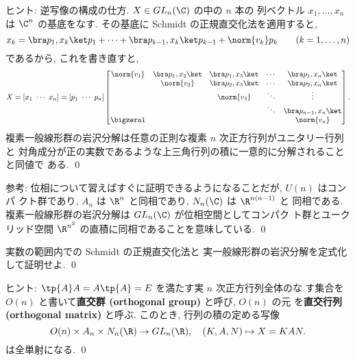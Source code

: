 \documentclass[12pt,twoside]{jarticle}
\begin{document}
\noindent
ヒント:  逆写像の構成の仕方. $X\in GL_n(\C)$ の中の $n$ 本の
列ベクトル $x_1,\dots,x_n$ は $\C^n$ の基底をなす. 
その基底に Schmidt の正規直交化法を適用すると,
\begin{equation*}
  x_k = \bra p_1,x_k\ket p_1 + \cdots + \bra p_{k-1},x_k\ket p_{k-1} +\norm{v_k} p_k 
  \qquad (k=1,\dots,n)
\end{equation*}
であるから, これを書き直すと,
\begin{equation*}
  X = [x_1\ \cdots\ x_n] =
  [p_1\ \cdots\ p_n]
  \begin{bmatrix}
    \norm{v_1} & \bra p_1,x_2\ket & \bra p_1,x_3\ket & \cdots & \bra p_1,x_n\ket \\
               & \norm{v_2}       & \bra p_2,x_3\ket & \cdots & \bra p_2,x_n\ket \\
               &                  & \norm{v_3}       & \ddots & \vdots \\
               &                  &                  & \ddots & \bra p_{n-1},x_n\ket \\
    \bigzerol  &                  &                  &        & \norm{v_n} \\
  \end{bmatrix}.
\end{equation*}
複素一般線形群の岩沢分解は任意の正則な複素 $n$ 次正方行列がユニタリー行列と
対角成分が正の実数であるような上三角行列の積に一意的に分解されることと同値で
ある. 
\qed

\medskip
\noindent
参考: 位相について習えばすぐに証明できるようになることだが, $U(n)$ はコンパ
クト群であり, $A_n$ は $\R^n$ と同相であり, $N_n(\C)$ は $\R^{n(n-1)}$ と
同相である.  複素一般線形群の岩沢分解は $GL_n(\C)$ が位相空間としてコンパク
ト群とユークリッド空間 $\R^{n^2}$ の直積に同相であることを意味している.
\qed


\begin{question}[15点]
\label{q:iwasawa-decomp-GLn(R)}
  実数の範囲内での Schmidt の正規直交化法と
  実一般線形群の岩沢分解を定式化して証明せよ. \qed
\end{question}

\noindent
ヒント: $\tp{A}A=A\tp{A}=E$ を満たす実 $n$ 次正方行列全体のな
す集合を $O(n)$ と書いて{\bf 直交群 (orthogonal group)} と呼び, $O(n)$ の元
を{\bf 直交行列 (orthogonal matrix)} と呼ぶ.  このとき, 行列の積の定める写像
\begin{equation*}
  O(n)\times A_n \times N_n(\R) \to GL_n(\R),
  \quad (K,A,N) \mapsto X = KAN.
\end{equation*}
は全単射になる.
\qed
\end{document}
